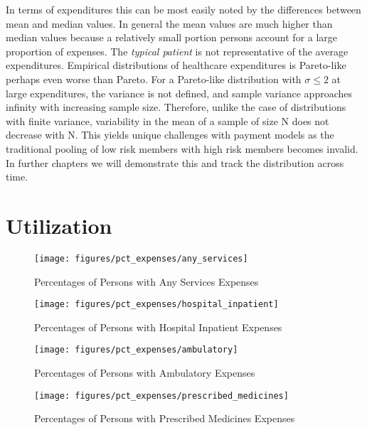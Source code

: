 \documentclass{ucetd}
\begin{document}
In terms of expenditures this can be most easily noted by the differences between mean and median values. In general the mean values are much higher than median values because a relatively small portion persons account for a large proportion of expenses. The \textit{typical patient} is not representative of the average expenditures. Empirical distributions of healthcare expenditures is Pareto-like perhaps even worse than Pareto. For a Pareto-like distribution with \(\sigma \leq 2\) at large expenditures, the variance is not defined, and sample variance approaches infinity with increasing sample size. Therefore, unlike the case of distributions with finite variance, variability in the mean of a sample of size N does not decrease with N. This yields unique challenges with payment models as the traditional pooling of low risk members with high risk members becomes invalid. In further chapters we will demonstrate this and track the distribution across time. 


\section{Utilization}

\medskip



\newpage

\begin{figure}[!ht]
\centering
\texttt{[image: figures/pct\_expenses/any\_services]}
\caption{Percentages of Persons with Any Services Expenses}
\label{fig:pct_expenses_any_services}
\end{figure}

\begin{figure}[!ht]
\centering
\texttt{[image: figures/pct\_expenses/hospital\_inpatient]}
\caption{Percentages of Persons with Hospital Inpatient Expenses}
\label{fig:pct_expenses_hospital_inpatient}
\end{figure}

\begin{figure}[!ht]
\centering
\texttt{[image: figures/pct\_expenses/ambulatory]}
\caption{Percentages of Persons with Ambulatory Expenses}
\label{fig:pct_expenses_ambulatory}
\end{figure}

\begin{figure}[!ht]
\centering
\texttt{[image: figures/pct\_expenses/prescribed\_medicines]}
\caption{Percentages of Persons with Prescribed Medicines Expenses}
\label{fig:pct_expenses_prescribed_medicines}
\end{figure}
\end{document}
